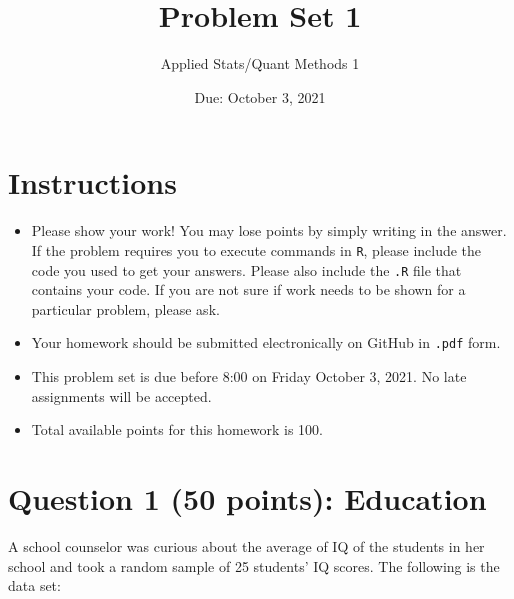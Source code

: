 \documentclass[12pt,letterpaper]{article}
\title{Problem Set 1}
\date{Due: October 3, 2021}
\author{Applied Stats/Quant Methods 1}
\begin{document}
	\maketitle
	
	\section*{Instructions}
	\begin{itemize}
		\item Please show your work! You may lose points by simply writing in the answer. If the problem requires you to execute commands in \texttt{R}, please include the code you used to get your answers. Please also include the \texttt{.R} file that contains your code. If you are not sure if work needs to be shown for a particular problem, please ask.
		\item Your homework should be submitted electronically on GitHub in \texttt{.pdf} form.
		\item This problem set is due before 8:00 on Friday October 3, 2021. No late assignments will be accepted.
		\item Total available points for this homework is 100.
	\end{itemize}
	
	\vspace{1cm}
	\section*{Question 1 (50 points): Education}
	
	A school counselor was curious about the average of IQ of the students in her school and took a random sample of 25 students' IQ scores. The following is the data set:\\
	\vspace{.5cm}
	
	\vspace{1cm}
	
\end{document}
